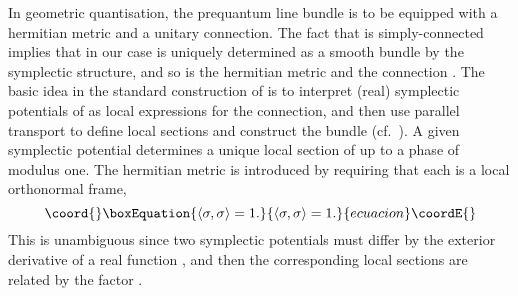 \documentclass[a4paper,11pt]{article}
\begin{document}
In geometric quantisation, the prequantum line bundle \coordHE{} is to be
equipped with a hermitian metric and a unitary connection. The
fact that \coordHE{} is simply-connected implies that in our
case \coordHE{} is uniquely determined as a smooth bundle by the symplectic
structure, and so is the
hermitian metric and the connection \coordHE{}. The basic idea in
the standard construction of \coordHE{} is to interpret (real) symplectic 
potentials of \myHighlight{$\omega$}\coordHE{} as local expressions for the connection, and then use 
parallel transport to define local sections and construct the 
bundle (cf.~\cite{Woo}). 
A given symplectic potential determines a unique local section 
\myHighlight{$\sigma$}\coordHE{} of \coordHE{} up to a phase of modulus one.
The hermitian metric is introduced by requiring that each \myHighlight{$\sigma$}\coordHE{} is
a local orthonormal frame,
\begin{equation}\coord{}\boxEquation{\label{hermit}
\langle \sigma,\sigma \rangle =1.
}{\langle \sigma,\sigma \rangle =1.
}{ecuacion}\coordE{}\end{equation}
This is unambiguous since two symplectic potentials must differ by the
exterior derivative of a real function \coordHE{}, and then the corresponding 
local sections are related by the factor \coordHE{}.
\end{document}
